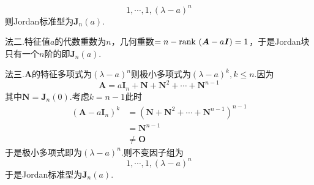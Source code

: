 {\begin{solution}
        \[
            1,\cdots,1,\left(\lambda-a\right)^n
        \]则Jordan标准型为$\bm{J}_n\left(a\right).$

        法二.特征值$a$的代数重数为$n$，几何重数$=n-\operatorname{rank\,} \left(
            \bm{A}-a\bm{I}
            \right)=1$，于是Jordan块只有一个$n$阶的即$\bm{J}_n\left(a\right)$.

        法三.$\bm{A}$的特征多项式为$\left(
            \lambda-a
            \right)^n$则极小多项式为$\left(
            \lambda-a
            \right)^k,k\leqslant n.$因为\[
            \bm{A}=a\bm{I}_n+\bm{N}+\bm{N}^2+\cdots+\bm{N}^{n-1}
        \]其中$\bm{N}=\bm{J}_n\left(0\right).$考虑$k=n-1$此时\begin{align*}
            \left(
            \bm{A}-a\bm{I}_n
            \right)^k & =\left(
            \bm{N}+\bm{N}^2+\cdots+\bm{N}^{n-1}
            \right)^{n-1}             \\
                      & =\bm{N}^{n-1} \\
                      & \neq \bm{O}
        \end{align*}于是极小多项式即为$\left(
            \lambda-a
            \right)^n$.则不变因子组为\[
            1,\cdots,1,\left(\lambda-a\right)^n\]于是Jordan标准型为$\bm{J}_n\left(a\right)$.
    \end{solution}
}
